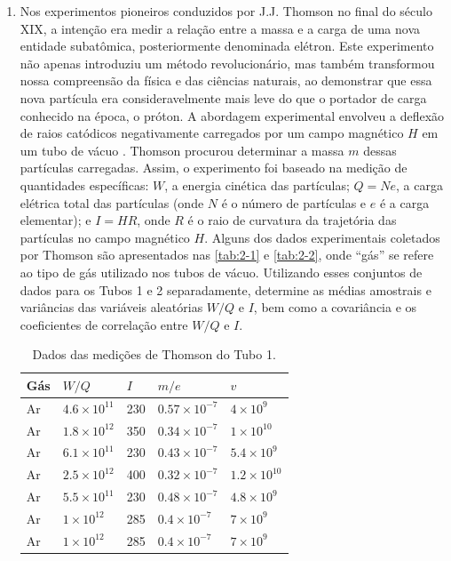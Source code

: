 \begin{enumerate}[label=\textbf{\arabic{chapter}.\arabic*.}]
	\item Nos experimentos pioneiros conduzidos por J.J. Thomson no final do século XIX, a intenção era medir a relação entre a massa e a carga de uma nova entidade subatômica, posteriormente denominada elétron. Este experimento não apenas introduziu um método revolucionário, mas também transformou nossa compreensão da física e das ciências naturais, ao demonstrar que essa nova partícula era consideravelmente mais leve do que o portador de carga conhecido na época, o próton. A abordagem experimental envolveu a deflexão de raios catódicos negativamente carregados por um campo magnético $H$ em um tubo de vácuo \citep{thomson1897xl}. Thomson procurou determinar a massa $m$ dessas partículas carregadas. Assim, o experimento foi baseado na medição de quantidades específicas: $W$, a energia cinética das partículas; $Q = Ne$, a carga elétrica total das partículas (onde $N$ é o número de partículas e $e$ é a carga elementar); e $I = HR$, onde $R$ é o raio de curvatura da trajetória das partículas no campo magnético $H$. Alguns dos dados experimentais coletados por Thomson são apresentados nas \autoref{tab:2-1} e \ref{tab:2-2}, onde ``gás'' se refere ao tipo de gás utilizado nos tubos de vácuo. Utilizando esses conjuntos de dados para os Tubos 1 e 2 separadamente, determine as médias amostrais e variâncias das variáveis aleatórias $W/Q$ e $I$, bem como a covariância e os coeficientes de correlação entre $W/Q$ e $I$.
	\begin{table}
		\centering
		\caption{Dados das medições de Thomson do Tubo 1.}
		\begin{tabular}{|l|l|l|l|l|}
			\hline
			Gás & $W/Q$ & $I$ & $m/e$ & $v$ \\
			\hline
			Ar & $4.6 \times 10^{11}$ & 230 & $0.57 \times 10^{-7}$ & $4 \times 10^{9}$ \\
			Ar & $1.8 \times 10^{12}$ & 350 & $0.34 \times 10^{-7}$ & $1 \times 10^{10}$ \\
			Ar & $6.1 \times 10^{11}$ & 230 & $0.43 \times 10^{-7}$ & $5.4 \times 10^{9}$ \\
			Ar & $2.5 \times 10^{12}$ & 400 & $0.32 \times 10^{-7}$ & $1.2 \times 10^{10}$ \\
			Ar & $5.5 \times 10^{11}$ & 230 & $0.48 \times 10^{-7}$ & $4.8 \times 10^{9}$ \\
			Ar & $1 \times 10^{12}$ & 285 & $0.4 \times 10^{-7}$ & $7 \times 10^{9}$ \\
			Ar & $1 \times 10^{12}$ & 285 & $0.4 \times 10^{-7}$ & $7 \times 10^{9}$ \\

\end{tabular}
\end{table}
\end{enumerate}
